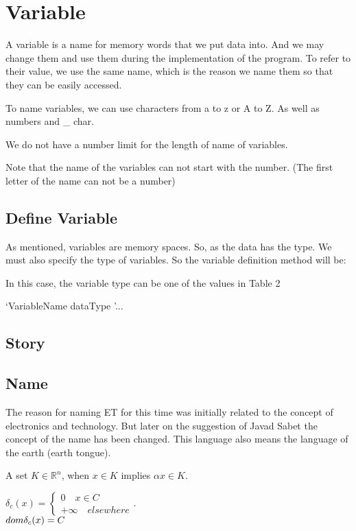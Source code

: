 \documentclass[11pt,fleqn]{book}
\def\R{\mathbb{R}}
\begin{document}
\section{Variable}


A variable is a name for memory words that we put data into. And we may change them and use them during the implementation of the program.
To refer to their value, we use the same name, which is the reason we name them so that they can be easily accessed.

To name variables, we can use characters from a to z or A to Z. As well as numbers and \_ char.

We do not have a number limit for the length of name of variables.

Note that the name of the variables can not start with the number. (The first letter of the name can not be a number)


\subsection{Define Variable}


As mentioned, variables are memory spaces. So, as the data has the type. We must also specify the type of variables.
So the variable definition method will be:

In this case, the variable type can be one of the values in Table 2

`VariableName dataType '...


\subsection{Story}

\subsection{Name}

The reason for naming ET for this time was initially related to the
concept of electronics and technology. But later on the suggestion of Javad Sabet the concept of
the name has been changed. This language also means the language of the earth (earth tongue).


\begin{definition}[Cone]
    A set $K \in \R^n$, when $x \in K $ implies $\alpha x \in K$.
\end{definition}

\begin{example}


$\delta_c(x) = \begin{cases}
0 \quad  x \in C \\
+ \infty \quad elsewhere
\end{cases}$.\\
$dom \space \delta_c(x) = C$
\end{example}
\end{document}

